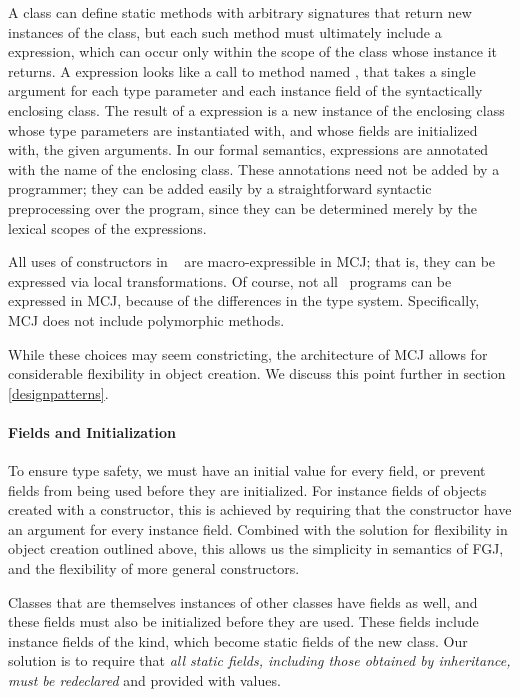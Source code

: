\documentclass[10pt]{acm-sigplan}
\begin{document}
A class can define static methods with arbitrary signatures that return
new instances of the class, but each such method must ultimately
include a {} expression, which can occur only within the
scope of the class whose instance it returns. A {} expression
looks like a call to method named {}, that takes a single
argument for each type parameter and each instance field of the
syntactically enclosing class. The result of a {} expression
is a new instance of the enclosing class whose type parameters are
instantiated with, and whose fields are initialized with, the given
arguments. In our formal semantics, {} expressions are
annotated with the name of the enclosing class. These annotations need
not be added by a programmer; they can be added easily by a
straightforward syntactic preprocessing over the program, since they
can be determined merely by the lexical scopes of the {}
expressions.

All uses of constructors in \FGJ\ \cite{FJ} are macro-expressible
\cite{FellExpress} in MCJ; that is, they can be expressed via local
transformations.  Of course, not all \FGJ\ programs can be expressed
in MCJ, because of the differences in the type system. Specifically,
MCJ does not include polymorphic methods.

While these choices may seem constricting, the architecture of MCJ
allows for considerable flexibility in object creation.  We discuss
this point further in section \ref{designpatterns}.

\paragraph{Fields and Initialization}

To ensure type safety, we must have an initial value for every field,
or prevent fields from being used before they are initialized.  For
instance fields of objects created with a constructor, this is achieved
by requiring that the constructor have an argument for every instance
field.  Combined with the solution for flexibility in object creation
outlined above, this allows us the simplicity in semantics of FGJ, and
the flexibility of more general constructors.  

Classes that are themselves instances of other classes have fields as
well, and these fields must also be initialized before they are used.
These fields include instance fields of the kind, which become static
fields of the new class.  Our solution is to require that \emph{all
  static fields, including those obtained by inheritance, must be
  redeclared} and provided with values.
\end{document}

